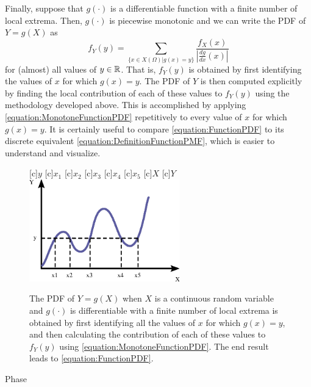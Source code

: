 Finally, suppose that $g(\cdot)$ is a differentiable function with a finite number of local extrema.
Then, $g(\cdot)$ is piecewise monotonic and we can write the PDF of $Y= g(X)$ as
\begin{equation} \label{equation:FunctionPDF}
f_Y (y) = \sum_{ \{ x \in X(\Omega) | g(x) = y \} }
\frac{f_X (x)}{\left| \frac{dg}{dx}(x) \right|}
\end{equation}
for (almost) all values of $y \in \mathbb{R}$.
That is, $f_Y (y)$ is obtained by first identifying the values of $x$ for which $g(x) = y$.
The PDF of $Y$ is then computed explicitly by finding the local contribution of each of these values to $f_Y(y)$ using the methodology developed above.
This is accomplished by applying \eqref{equation:MonotoneFunctionPDF} repetitively to every value of $x$ for which $g(x) = y$.
It is certainly useful to compare \eqref{equation:FunctionPDF} to its discrete equivalent \eqref{equation:DefinitionFunctionPMF}, which is easier to understand and visualize.

\begin{figure}[ht]
\begin{center}
\begin{psfrags}
[c]{$y$}
[c]{$x_1$}
[c]{$x_2$}
[c]{$x_3$}
[c]{$x_4$}
[c]{$x_5$}
[c]{$X$}
[c]{$Y$}
\includegraphics[width=6.5cm]{Figures/9Chapter/DerivedPDF}
\end{psfrags}
\caption{The PDF of $Y = g(X)$ when $X$ is a continuous random variable and $g(\cdot)$ is differentiable with a finite number of local extrema is obtained by first identifying all the values of $x$ for which $g(x) = y$, and then calculating the contribution of each of these values to $f_Y(y)$ using \eqref{equation:MonotoneFunctionPDF}.
The end result leads to \eqref{equation:FunctionPDF}.}
\end{center}
\end{figure}

\begin{example}
Phase
\end{example}


